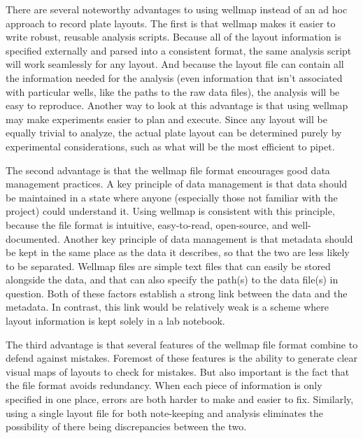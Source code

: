 \documentclass[twocolumn]{bmcart}
\begin{document}
There are several noteworthy advantages to using wellmap instead
of an ad hoc approach to record plate layouts. The first is that wellmap
makes it easier to write robust, reusable analysis scripts. Because
all of the layout information is specified externally and parsed into
a consistent format, the same analysis script will work seamlessly
for any layout. And because the layout file can contain all the information
needed for the analysis (even information that isn't associated with
particular wells, like the paths to the raw data files), the analysis
will be easy to reproduce. Another way to look at this advantage is
that using wellmap may make experiments easier to plan and execute.
Since any layout will be equally trivial to analyze, the actual plate
layout can be determined purely by experimental considerations, such
as what will be the most efficient to pipet. 

The second advantage is that the wellmap file format encourages good
data management practices. A key principle of data management is that
data should be maintained in a state where anyone (especially those
not familiar with the project) could understand it. Using wellmap
is consistent with this principle, because the file format is intuitive,
easy-to-read, open-source, and well-documented. Another key principle
of data management is that metadata should be kept in the same place
as the data it describes, so that the two are less likely to be separated.
Wellmap files are simple text files that can easily be stored alongside
the data, and that can also specify the path(s) to the data file(s)
in question. Both of these factors establish a strong link between
the data and the metadata. In contrast, this link would be relatively
weak is a scheme where layout information is kept solely in a lab
notebook.

The third advantage is that several features of the wellmap file
format combine to defend against mistakes. Foremost of these features
is the ability to generate clear visual maps of layouts to check for
mistakes. But also important is the fact that the file format avoids
redundancy. When each piece of information is only specified in one
place, errors are both harder to make and easier to fix. Similarly,
using a single layout file for both note-keeping and analysis eliminates
the possibility of there being discrepancies between the two.
\end{document}
